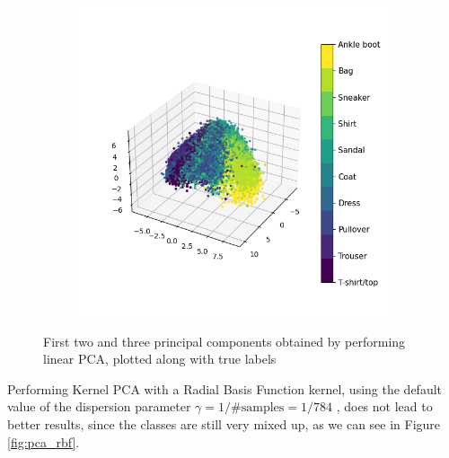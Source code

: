 \documentclass[12pt]{article}
\begin{document}
\begin{figure}[h]
\begin{subfigure}{0.5\textwidth}
		\includegraphics[width=0.4\textheight]{pca_linear_3comps.png}
		\caption{}
		\label{subfig:lpca_linear_3comps}
	\end{subfigure}
	\caption{First two and three principal components obtained by performing linear PCA, plotted along with true labels}
	\label{fig:pca_linear}
\end{figure}

Performing Kernel PCA with a Radial Basis Function kernel, using the default value of the dispersion parameter %
 $\gamma = 1/\mathrm{\# samples} = 1/784$ , does not lead to better results, since the classes are still very mixed up, as we can see in Figure \ref{fig:pca_rbf}.
 
\end{document}
